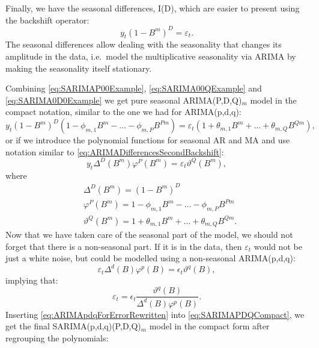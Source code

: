 \documentclass[
]{book}
\theoremstyle{definition}
\theoremstyle{definition}
\theoremstyle{definition}
\theoremstyle{definition}
\theoremstyle{remark}
\begin{document}
Finally, we have the seasonal differences, I(D), which are easier to present using the backshift operator:
\begin{equation}
  y_t (1-B^m)^D = \varepsilon_t.
  \label{eq:SARIMA0D0Example}
\end{equation}
The seasonal differences allow dealing with the seasonality that changes its amplitude in the data, i.e.~model the multiplicative seasonality via ARIMA by making the seasonality itself stationary.

Combining \eqref{eq:SARIMAP00Example}, \eqref{eq:SARIMA00QExample} and \eqref{eq:SARIMA0D0Example} we get pure seasonal ARIMA(P,D,Q)\(_m\) model in the compact notation, similar to the one we had for ARIMA(p,d,q):
\begin{equation}
  y_t (1-B^m)^D (1 - \phi_{m,1} B^m - \dots - \phi_{m,P} B^{Pm}) = \varepsilon_t (1 + \theta_{m,1} B^m + \dots + \theta_{m,Q} B^{Qm}),
  \label{eq:SARIMAPDQ}
\end{equation}
or if we introduce the polynomial functions for seasonal AR and MA and use notation similar to \eqref{eq:ARIMADifferencesSecondBackshift}:
\begin{equation}
  y_t \Delta^D(B^m) \varphi^P(B^m) = \varepsilon_t \vartheta^Q(B^m),
  \label{eq:SARIMAPDQCompact}
\end{equation}
where
\begin{equation}
\begin{aligned}
  & \Delta^D(B^m) = (1-B^m)^D \\
  & \varphi^P(B^m) = 1 - \phi_{m,1} B^m  - \dots - \phi_{m,P} B^{Pm} \\ 
  & \vartheta^Q(B^m) = 1 + \theta_{m,1} B^m + \dots + \theta_{m,Q} B^{Qm} .
\end{aligned}
  \label{eq:SARIMAPolynomials}
\end{equation}
Now that we have taken care of the seasonal part of the model, we should not forget that there is a non-seasonal part. If it is in the data, then \(\varepsilon_t\) would not be just a white noise, but could be modelled using a non-seasonal ARIMA(p,d,q):
\begin{equation}
  \varepsilon_t \Delta^d(B) \varphi^p(B) = \epsilon_t \vartheta^q(B),
  \label{eq:ARIMApdqForError}
\end{equation}
implying that:
\begin{equation}
  \varepsilon_t = \epsilon_t \frac{\vartheta^q(B)}{\Delta^d(B) \varphi^p(B)}.
  \label{eq:ARIMApdqForErrorRewritten}
\end{equation}
Inserting \eqref{eq:ARIMApdqForErrorRewritten} into \eqref{eq:SARIMAPDQCompact}, we get the final SARIMA(p,d,q)(P,D,Q)\(_m\) model in the compact form after regrouping the polynomials:
\end{document}
